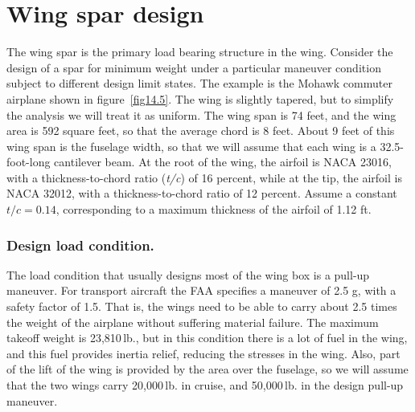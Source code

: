 \documentclass{AeroStructure-ERJohnson}
\begin{document}
\section{Wing spar design}\label{sec14.2}

The wing spar is the primary load bearing structure in the wing. Consider the design of a spar for minimum weight under a particular maneuver condition subject to different design limit states. The example is the Mohawk commuter airplane shown in figure~\ref{fig14.5}. The wing is slightly tapered, but to simplify the analysis we will treat it as uniform. The wing span is 74 feet, and the wing area is 592 square feet, so that the average chord is 8 feet. About 9 feet of this wing span is the fuselage width, so that we will assume that each wing is a 32.5-foot-long cantilever beam. At the root of the wing, the airfoil is NACA 23016, with a thickness-to-chord ratio (\textit{t/c}) of 16 percent, while at the tip, the airfoil is  NACA 32012, with a thickness-to-chord ratio of 12 percent. Assume a constant ${t/c} = 0.14$, corresponding to a maximum thickness of the airfoil of 1.12 ft.

{\def\thefigure{14.5}
}


\subsubsection{Design load condition.} The load condition that usually designs most of the wing box is a pull-up maneuver. For transport aircraft the FAA specifies a maneuver of 2.5 g, with a safety factor of 1.5. That is, the wings need to be able to carry about 2.5 times the weight of the airplane without suffering material failure. The maximum takeoff weight is 23{,}810\,lb., but in this condition there is a lot of fuel in the wing, and this fuel provides inertia relief, reducing the stresses in the wing. Also, part of the lift of the wing is provided by the area over the fuselage, so we will assume that the two wings carry 20{,}000\,lb. in cruise, and 50{,}000\,lb. in the design pull-up maneuver.
\end{document}
